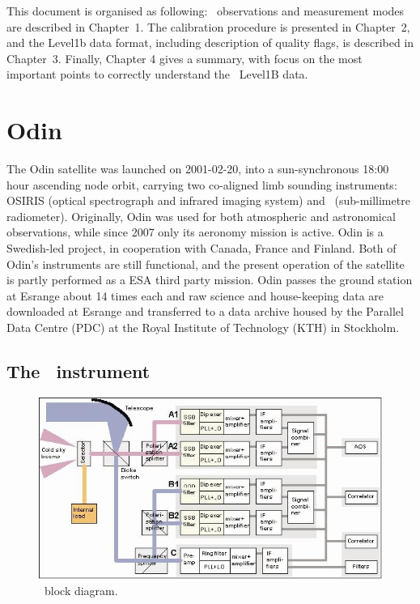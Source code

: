 This document is organised as following:
\smr\ observations and measurement modes are described 
in Chapter~1. The calibration procedure is presented in
Chapter~2, and the Level1b data format, including description
of quality flags, is described in Chapter~3.
Finally,
Chapter 4 gives a summary, with focus on the most important points to correctly
understand the \smr\ Level1B data. 
   

\section{Odin}

The Odin satellite was launched on 2001-02-20, into a sun-synchronous
18:00 hour ascending node orbit, carrying two co-aligned limb sounding
instruments: OSIRIS (optical spectrograph and infrared imaging system) and
\SMR\ (sub-millimetre radiometer). Originally, Odin was used for both
atmospheric and astronomical observations, while since 2007 only its aeronomy
mission is active. Odin is a Swedish-led project, in cooperation with Canada,
France and Finland. Both of Odin's instruments are still functional, and the
present operation of the satellite is partly performed as a ESA third party
mission.
Odin passes the ground station at Esrange about 14 times each
and raw science and house-keeping data are downloaded at
Esrange and transferred to a data archive housed by the Parallel
Data Centre (PDC) at the Royal Institute of Technology (KTH)
in Stockholm.


\subsection{The \SMR\ instrument}

\begin{figure}[t]
\includegraphics[width=14cm]{Odin_Auto2.jpg}
\caption{\smr\ block diagram.}
\label{fig:blockdiagram}
\end{figure}




